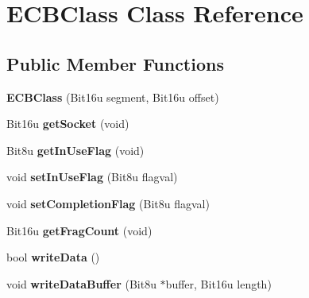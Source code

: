 \hypertarget{classECBClass}{\section{E\-C\-B\-Class Class Reference}
\label{classECBClass}
}
\subsection*{Public Member Functions}
\begin{DoxyCompactItemize}
\item 
\hypertarget{classECBClass_ae387da241c2158e1aa0d5bcaf4cbd5dd}{{\bfseries E\-C\-B\-Class} (Bit16u segment, Bit16u offset)}\label{classECBClass_ae387da241c2158e1aa0d5bcaf4cbd5dd}

\item 
\hypertarget{classECBClass_a1bbca148187be009ee5afb8361dc1a83}{Bit16u {\bfseries get\-Socket} (void)}\label{classECBClass_a1bbca148187be009ee5afb8361dc1a83}

\item 
\hypertarget{classECBClass_a16c98cca787eadd52d6bd9cdf2df7601}{Bit8u {\bfseries get\-In\-Use\-Flag} (void)}\label{classECBClass_a16c98cca787eadd52d6bd9cdf2df7601}

\item 
\hypertarget{classECBClass_a162bd583fec443406be6316f6a2c6de2}{void {\bfseries set\-In\-Use\-Flag} (Bit8u flagval)}\label{classECBClass_a162bd583fec443406be6316f6a2c6de2}

\item 
\hypertarget{classECBClass_a700f3b59267179faafd9fd1b05ef17e3}{void {\bfseries set\-Completion\-Flag} (Bit8u flagval)}\label{classECBClass_a700f3b59267179faafd9fd1b05ef17e3}

\item 
\hypertarget{classECBClass_a973aa03e534476d98a09fd7323844440}{Bit16u {\bfseries get\-Frag\-Count} (void)}\label{classECBClass_a973aa03e534476d98a09fd7323844440}

\item 
\hypertarget{classECBClass_a140ea86ae46cb000b172f931549ab11e}{bool {\bfseries write\-Data} ()}\label{classECBClass_a140ea86ae46cb000b172f931549ab11e}

\item 
\hypertarget{classECBClass_a976b6696fae7933dcf50e836ba966180}{void {\bfseries write\-Data\-Buffer} (Bit8u $\ast$buffer, Bit16u length)}\label{classECBClass_a976b6696fae7933dcf50e836ba966180}


\end{DoxyCompactItemize}
